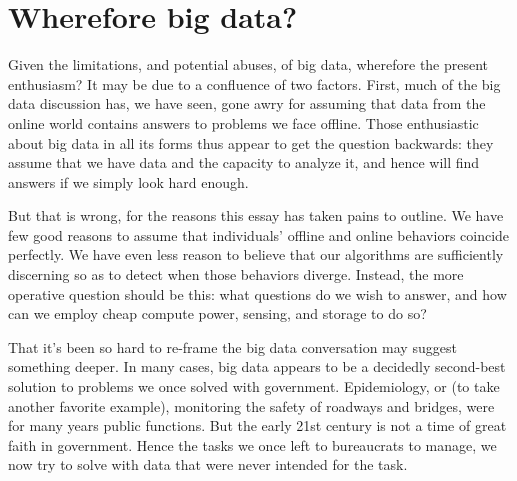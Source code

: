 \documentclass[12pt]{article}
\begin{document}





\section{Wherefore big data?}
\label{sec:wherefore-big-data}

Given the limitations, and potential abuses, of big data, wherefore
the present enthusiasm? It may be due to a confluence of two
factors. First, much of the big data discussion has, we have seen,
gone awry for assuming that data from the online world contains
answers to problems we face offline. Those enthusiastic about big data
in all its forms thus appear to get the question backwards: they
assume that we have data and the capacity to analyze it, and hence
will find answers if we simply look hard enough. 

But that is wrong, for the reasons this essay has taken pains to
outline. We have few good reasons to assume that individuals' offline
and online behaviors coincide perfectly. We have even less reason to
believe that our algorithms are sufficiently discerning so as to
detect when those behaviors diverge. Instead, the more operative
question should be this: what questions do we wish to answer, and how
can we employ cheap compute power, sensing, and storage to do so?

That it's been so hard to re-frame the big data conversation may
suggest something deeper. In many cases, big data appears to be a
decidedly second-best solution to problems we once solved with
government. Epidemiology, or (to take another favorite example),
monitoring the safety of roadways and bridges, were for many years
public functions. But the early 21st century is not a time of great
faith in government. Hence the tasks we once left to bureaucrats to
manage, we now try to solve with data that were never intended for the
task. 
\end{document}
